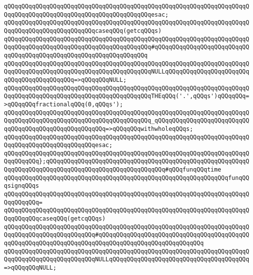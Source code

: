 \newline
\verb|qQQqqQQqqQQqqQQqqQQqqQQqqQQqqQQqqQQqqQQqqQQqqQQqqQQqqQQqqQQqqQQqqQQqqQQqqQQqqQQqqQQqqQQqqQQqqQQqqQQqqQQqqQQqqQQqesac;|\newline
\newline
\verb|qQQqqQQqqQQqqQQqqQQqqQQqqQQqqQQqqQQqqQQqqQQqqQQqqQQqqQQqqQQqqQQqqQQqqQQqqQQqqQQqqQQqqQQqqQQqqQQqcaseqQQq(getcqQQqs)|\newline
\verb|qQQqqQQqqQQqqQQqqQQqqQQqqQQqqQQqqQQqqQQqqQQqqQQqqQQqqQQqqQQqqQQqqQQqqQQqqQQqqQQqqQQqqQQqqQQqqQQqqQQqqQQqqQQqqQQq#qQQqqQQqqQQqqQQqqQQqqQQqqQQqqQQqqQQqqQQqqQQqqQQqqQQqqQQqqQQqqQQqqQQq|\newline
\verb|qQQqqQQqqQQqqQQqqQQqqQQqqQQqqQQqqQQqqQQqqQQqqQQqqQQqqQQqqQQqqQQqqQQqqQQqqQQqqQQqqQQqqQQqqQQqqQQqqQQqqQQqqQQqqQQqNULLqQQqqQQqqQQqqQQqqQQqqQQqqQQqqQQqqQQqqQQqqQQq=>qQQqqQQqNULL;|\newline
\verb|qQQqqQQqqQQqqQQqqQQqqQQqqQQqqQQqqQQqqQQqqQQqqQQqqQQqqQQqqQQqqQQqqQQqqQQqqQQqqQQqqQQqqQQqqQQqqQQqqQQqqQQqqQQqqQQqTHEqQQq('.',qQQqs')qQQqqQQq=>qQQqqQQqfractionalqQQq(0,qQQqs');|\newline
\verb|qQQqqQQqqQQqqQQqqQQqqQQqqQQqqQQqqQQqqQQqqQQqqQQqqQQqqQQqqQQqqQQqqQQqqQQqqQQqqQQqqQQqqQQqqQQqqQQqqQQqqQQqqQQqqQQq_qQQqqQQqqQQqqQQqqQQqqQQqqQQqqQQqqQQqqQQqqQQqqQQqqQQqqQQq=>qQQqqQQqwithwholeqQQqs;|\newline
\verb|qQQqqQQqqQQqqQQqqQQqqQQqqQQqqQQqqQQqqQQqqQQqqQQqqQQqqQQqqQQqqQQqqQQqqQQqqQQqqQQqqQQqqQQqqQQqqQQqesac;|\newline
\verb|qQQqqQQqqQQqqQQqqQQqqQQqqQQqqQQqqQQqqQQqqQQqqQQqqQQqqQQqqQQqqQQqqQQqqQQqqQQqqQQq};qQQqqQQqqQQqqQQqqQQqqQQqqQQqqQQqqQQqqQQqqQQqqQQqqQQqqQQqqQQqqQQqqQQqqQQqqQQqqQQqqQQqqQQqqQQqqQQqqQQqqQQq#qQQqfunqQQqtime|\newline
\newline
\verb|qQQqqQQqqQQqqQQqqQQqqQQqqQQqqQQqqQQqqQQqqQQqqQQqqQQqqQQqqQQqqQQqfunqQQqsignqQQqs|\newline
\verb|qQQqqQQqqQQqqQQqqQQqqQQqqQQqqQQqqQQqqQQqqQQqqQQqqQQqqQQqqQQqqQQqqQQqqQQqqQQqqQQq=|\newline
\verb|qQQqqQQqqQQqqQQqqQQqqQQqqQQqqQQqqQQqqQQqqQQqqQQqqQQqqQQqqQQqqQQqqQQqqQQqqQQqqQQqcaseqQQq(getcqQQqs)|\newline
\verb|qQQqqQQqqQQqqQQqqQQqqQQqqQQqqQQqqQQqqQQqqQQqqQQqqQQqqQQqqQQqqQQqqQQqqQQqqQQqqQQqqQQqqQQqqQQqqQQq#qQQqqQQqqQQqqQQqqQQqqQQqqQQqqQQqqQQqqQQqqQQqqQQqqQQqqQQqqQQqqQQqqQQqqQQqqQQqqQQqqQQqqQQqqQQqqQQqqQQq|\newline
\verb|qQQqqQQqqQQqqQQqqQQqqQQqqQQqqQQqqQQqqQQqqQQqqQQqqQQqqQQqqQQqqQQqqQQqqQQqqQQqqQQqqQQqqQQqqQQqqQQqNULLqQQqqQQqqQQqqQQqqQQqqQQqqQQqqQQqqQQqqQQq=>qQQqqQQqNULL;|\newline
